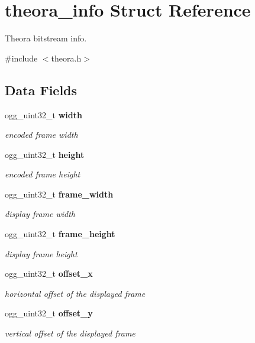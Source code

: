 \section{theora\_\-info Struct Reference}
\label{structtheora__info}


Theora bitstream info.  


{\ttfamily \#include $<$theora.h$>$}\subsection*{Data Fields}
\begin{DoxyCompactItemize}
\item 
ogg\_\-uint32\_\-t {\bf width}
\begin{DoxyCompactList}\small\item\em encoded frame width \item\end{DoxyCompactList}\item 
ogg\_\-uint32\_\-t {\bf height}
\begin{DoxyCompactList}\small\item\em encoded frame height \item\end{DoxyCompactList}\item 
ogg\_\-uint32\_\-t {\bf frame\_\-width}
\begin{DoxyCompactList}\small\item\em display frame width \item\end{DoxyCompactList}\item 
ogg\_\-uint32\_\-t {\bf frame\_\-height}
\begin{DoxyCompactList}\small\item\em display frame height \item\end{DoxyCompactList}\item 
ogg\_\-uint32\_\-t {\bf offset\_\-x}
\begin{DoxyCompactList}\small\item\em horizontal offset of the displayed frame \item\end{DoxyCompactList}\item 
ogg\_\-uint32\_\-t {\bf offset\_\-y}
\begin{DoxyCompactList}\small\item\em vertical offset of the displayed frame \item\end{DoxyCompactList}\item 

\end{DoxyCompactItemize}
